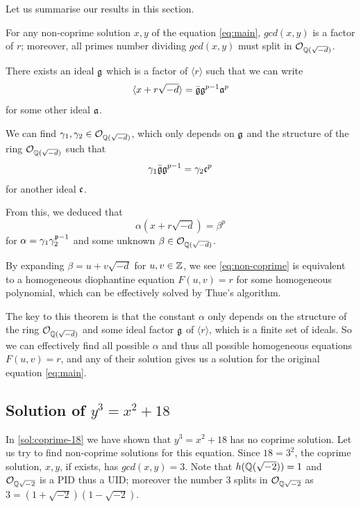 Let us summarise our results in this section. 
\begin{theorem}
	For any non-coprime solution $x, y$ of the equation \ref{eq:main},
	$gcd(x, y)$ is a factor of $r$; moreover, all primes number dividing $gcd(x, y)$ must split in $\mathcal{O}_{\mathbb{Q}(\sqrt{-d})}$. 

	There exists an ideal $\mathfrak{g}$ which is a factor of $\langle r\rangle$ such that we can write
	$$
	\langle x + r\sqrt{-d} \rangle= \bar{\mathfrak{g}} \mathfrak{g}^{p-1} \mathfrak{a}^p
	$$
	for some other ideal $\mathfrak{a}$.

	We can find $\gamma_1, \gamma_2 \in \mathcal{O}_{\mathbb{Q}(\sqrt{-d})}$, which only depends on $\mathfrak{g}$ and the structure of the ring $\mathcal{O}_{\mathbb{Q}(\sqrt{-d})}$ such that 
	$$
		\gamma_1 \bar{\mathfrak{g}} \mathfrak{g}^{p-1} = \gamma_2 \mathfrak{c}^p
	$$
	for another ideal $\mathfrak{c}$. 

	From this, we deduced that 
	\begin{equation}\label{eq:non-coprime}
		\alpha (x + r\sqrt{-d}) = \beta^p
	\end{equation}
	for $\alpha = \gamma_1 \gamma_2^{\mathfrak{p}-1}$ and some unknown $\beta \in \mathcal{O}_{\mathbb{Q}(\sqrt{-d})}$.

	By expanding $\beta = u + v \sqrt{-d}$ for $u, v \in \mathbb{Z}$, we see \autoref{eq:non-coprime} is equivalent to a homogeneous diophantine equation $F(u, v) = r$ for some homogeneous polynomial, which can be effectively solved by Thue's algorithm.
\end{theorem}

\begin{remark}
The key to this theorem is that the constant $\alpha$ only depends on the structure of the ring $\mathcal{O}_{\mathbb{Q}(\sqrt{-d})}$ and some ideal factor $\mathfrak{g}$ of $\langle r\rangle$, which is a finite set of ideals.
So we can effectively find all possible $\alpha$ and thus all possible homogeneous equations $F(u, v) = r$, and any of their solution gives us a solution for the original equation \ref{eq:main}.
\end{remark}

\subsection{Solution of \texorpdfstring{$y^3 = x^2 + 18$}{}}

In \autoref{sol:coprime-18} we have shown that $y^3 = x^2 + 18$ has no coprime solution.
Let us try to find non-coprime solutions for this equation.
Since $18 = 3^2$, the coprime solution, $x, y$, if exists, has $gcd(x, y) = 3$.
Note that $h(\mathbb{Q}(\sqrt{-2})) = 1$ and $\mathcal{O}_{\mathbb{Q}{\sqrt{-2}}}$ is a PID thus a UID; moreover the number $3$ splits in $\mathcal{O}_{\mathbb{Q}{\sqrt{-2}}}$ as $3 = (1 + \sqrt{-2})(1 - \sqrt{-2})$.

